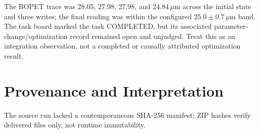 \documentclass[journal]{IEEEtran}
\begin{document}
The BOPET trace was 28.05, 27.98, 27.98, and $24.84\,\mu\mathrm{m}$ across the
initial state and three writes; the final reading was within the configured
$25.0\pm0.7\,\mu\mathrm{m}$ band. The task board marked the task COMPLETED,
but its associated parameter-change/optimization record remained open and
unjudged. Treat this as an integration observation, not a completed or causally attributed
optimization result.

\section{Provenance and Interpretation}
The source run lacked a contemporaneous SHA-256 manifest; ZIP hashes verify
delivered files only, not runtime immutability.
\end{document}
